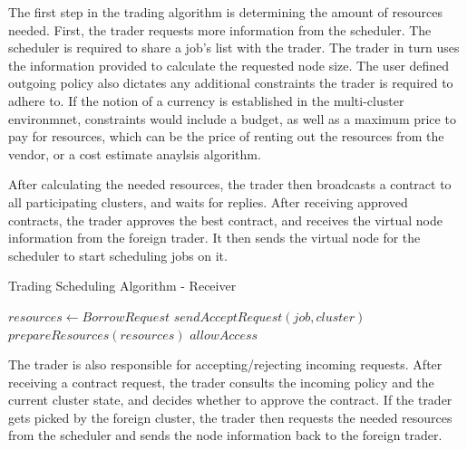The first step in the trading algorithm is determining the amount of resources
needed. First, the trader requests more information from the scheduler. The
scheduler is required to share a job's list with the trader. The trader in turn
uses the information provided to calculate the requested node size. The user
defined outgoing policy also dictates any additional constraints the trader is
required to adhere to. If the notion of a currency is established in the
multi-cluster environmnet, constraints would include a budget, as well as a
maximum price to pay for resources, which can be the price of renting out the
resources from the vendor, or a cost estimate anaylsis algorithm. 

After calculating the needed resources, the trader then broadcasts a contract
to all participating clusters, and waits for replies. After receiving approved
contracts, the trader approves the best contract, and receives the virtual node
information from the foreign trader. It then sends the virtual node for the
scheduler to start scheduling jobs on it.

\begin{algorithm}[H]
    \caption{Trading Scheduling Algorithm - Receiver}
    \begin{algorithmic}
            \State $ resources \gets BorrowRequest $  
            \State $sendAcceptRequest(job, cluster)$
            \State $prepareResources(resources)$
            \State $allowAccess$
            \EndIf
    \end{algorithmic}
\end{algorithm} 

The trader is also responsible for accepting/rejecting incoming requests. After
receiving a contract request, the trader consults the incoming policy and the
current cluster state, and decides whether to approve the contract. If the
trader gets picked by the foreign cluster, the trader then requests the needed
resources from the scheduler and sends the node information back to the foreign
trader.
